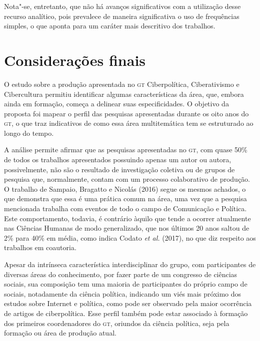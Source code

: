 {

Nota"-se, entretanto, que não há avanços significativos com a utilização
desse recurso analítico, pois prevalece de maneira significativa o uso
de frequências simples, o que aponta para um caráter mais descritivo dos
trabalhos.

\section{Considerações finais}

O estudo sobre a produção apresentada no \textsc{gt} Ciberpolítica, Ciberativismo
e Cibercultura permitiu identificar algumas características da área,
que, embora ainda em formação, começa a delinear suas especificidades. O
objetivo da proposta foi mapear o perfil das pesquisas apresentadas
durante os oito anos do \textsc{gt}, o que traz indicativos de como essa área
multitemática tem se estruturado ao longo do tempo.

A análise permite afirmar que as pesquisas apresentadas no \textsc{gt}, com quase
50\% de todos os trabalhos apresentados possuindo apenas um autor ou
autora, possivelmente, não são o resultado de investigação coletiva ou
de grupos de pesquisa que, normalmente, contam com um processo
colaborativo de produção. O trabalho de Sampaio, Bragatto e Nicolás
(2016) segue os mesmos achados, o que demonstra que essa é uma prática
comum na área, uma vez que a pesquisa mencionada trabalha com eventos de
todo o campo de Comunicação e Política. Este comportamento, todavia, é
contrário àquilo que tende a ocorrer atualmente nas Ciências Humanas de
modo generalizado, que nos últimos 20 anos saltou de 2\% para 40\% em
média, como indica Codato \textit{et al.} (2017), no que diz respeito aos
trabalhos em coautoria.

Apesar da intrínseca característica interdisciplinar do grupo, com
participantes de diversas áreas do conhecimento, por fazer parte de um
congresso de ciências sociais, sua composição tem uma maioria de
participantes do próprio campo de sociais, notadamente da ciência
política, indicando um viés mais próximo dos estudos sobre Internet e
política, como pode ser observado pela maior ocorrência de artigos de
ciberpolítica. Esse perfil também pode estar associado à formação dos
primeiros coordenadores do \textsc{gt}, oriundos da ciência política, seja pela
formação ou área de produção atual.

}
